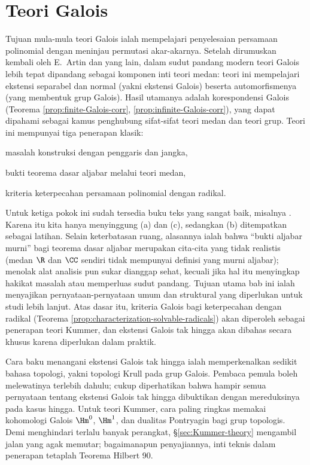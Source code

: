 
\chapter{Teori Galois}\label{sec:Galois}
Tujuan mula-mula teori Galois ialah mempelajari penyelesaian persamaan polinomial dengan meninjau permutasi akar-akarnya. Setelah dirumuskan kembali oleh E.\ Artin dan yang lain, dalam sudut pandang modern teori Galois lebih tepat dipandang sebagai komponen inti teori medan: teori ini mempelajari ekstensi separabel dan normal (yakni ekstensi Galois) beserta automorfismenya (yang membentuk grup Galois). Hasil utamanya adalah korespondensi Galois (Teorema \ref{prop:finite-Galois-corr}, \ref{prop:infinite-Galois-corr}), yang dapat dipahami sebagai kamus penghubung sifat-sifat teori medan dan teori grup. Teori ini mempunyai tiga penerapan klasik:
\begin{compactenum}[(a)]
	\item masalah konstruksi dengan penggaris dan jangka,
	\item bukti teorema dasar aljabar melalui teori medan,
	\item kriteria keterpecahan persamaan polinomial dengan radikal.
\end{compactenum}
Untuk ketiga pokok ini sudah tersedia buku teks yang sangat baik, misalnya \cite{ZhP}. Karena itu kita hanya menyinggung (a) dan (c), sedangkan (b) ditempatkan sebagai latihan. Selain keterbatasan ruang, alasannya ialah bahwa ``bukti aljabar murni'' bagi teorema dasar aljabar merupakan cita-cita yang tidak realistis (medan $\R$ dan $\CC$ sendiri tidak mempunyai definisi yang murni aljabar); menolak alat analisis pun sukar dianggap sehat, kecuali jika hal itu menyingkap hakikat masalah atau memperluas sudut pandang. Tujuan utama bab ini ialah menyajikan pernyataan-pernyataan umum dan struktural yang diperlukan untuk studi lebih lanjut. Atas dasar itu, kriteria Galois bagi keterpecahan dengan radikal (Teorema \ref{prop:characterization-solvable-radicals}) akan diperoleh sebagai penerapan teori Kummer, dan ekstensi Galois tak hingga akan dibahas secara khusus karena diperlukan dalam praktik.

\begin{wenxintishi}
	Cara baku menangani ekstensi Galois tak hingga ialah memperkenalkan sedikit bahasa topologi, yakni topologi Krull pada grup Galois. Pembaca pemula boleh melewatinya terlebih dahulu; cukup diperhatikan bahwa hampir semua pernyataan tentang ekstensi Galois tak hingga dibuktikan dengan mereduksinya pada kasus hingga. Untuk teori Kummer, cara paling ringkas memakai kohomologi Galois $\Hm^0$, $\Hm^1$, dan dualitas Pontryagin bagi grup topologis. Demi menghindari terlalu banyak perangkat, \S\ref{sec:Kummer-theory} mengambil jalan yang agak memutar; bagaimanapun penyajiannya, inti teknis dalam penerapan tetaplah Teorema Hilbert 90.
\end{wenxintishi}

